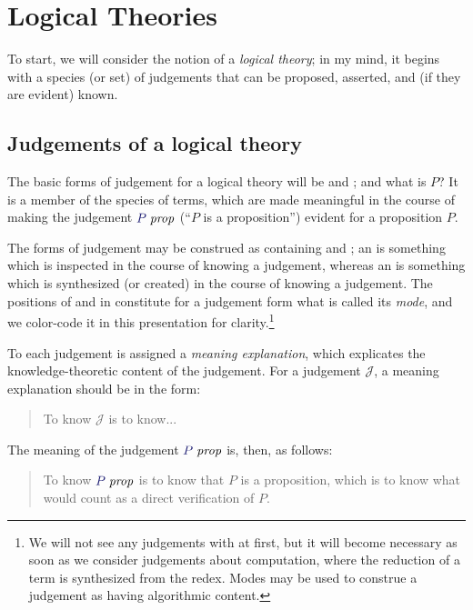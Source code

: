 \documentclass[main.tex]{subfiles}
\begin{document}
\onehalfspacing

\chapter{Logical Theories}

To start, we will consider the notion of a \emph{logical theory}; in
my mind, it begins with a species (or set) of judgements that can be
proposed, asserted, and (if they are evident) known.

\section{Judgements of a logical theory}

The basic forms of judgement for a logical theory will be
 and ; and what is $P$?  It is a
member of the species of terms, which are made meaningful in the course of
making the judgement $\isprop{P}$ (``$P$ is a proposition'') evident for a
proposition $P$.

The forms of judgement may be construed as containing
 and ; an
 is something which is inspected in the course of
knowing a judgement, whereas an  is something which
is synthesized (or created) in the course of knowing a judgement. The positions
of  and  in constitute
for a judgement form what is called its \emph{mode}, and we color-code it in
this presentation for clarity.\footnote{We will not see any judgements with
 at first, but it will become necessary as
soon as we consider judgements about computation, where the reduction of a term
is synthesized from the redex. Modes may be used to construe a judgement as
having algorithmic content.}

To each judgement is assigned a \emph{meaning explanation}, which explicates
the knowledge-theoretic content of the judgement. For a judgement
$\mathcal{J}$, a meaning explanation should be in the form:

\begin{quote}
  To know $\mathcal{J}$ is to know...
\end{quote}

The meaning of the judgement $\isprop{P}$ is, then, as follows:

\begin{quote}
  To know $\isprop{P}$ is to know that $P$ is a proposition, which is to know
  what would count as a direct verification of $P$.
\end{quote}
\end{document}
